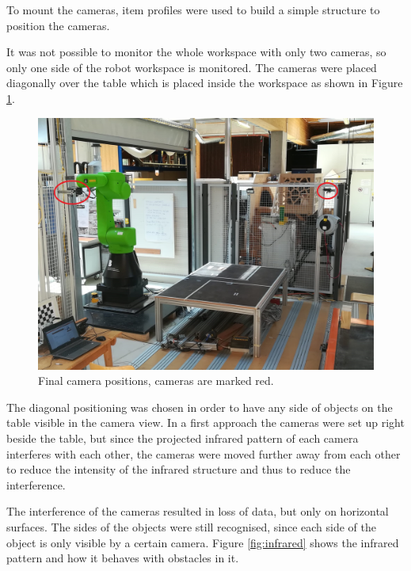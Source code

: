 To mount the cameras, item profiles \cite{Item} were used to build a simple structure to position the cameras.

It was not possible to monitor the whole workspace with only two cameras, so only one side of the robot workspace is monitored. The cameras were placed diagonally over the table which is placed inside the workspace as shown in Figure  \ref{fig:campos}.

\begin{figure}[H]                                      
	\centering\includegraphics[scale=0.2]{images/campos.jpeg}			
	\caption{Final camera positions, cameras are marked red.}
	\label{fig:campos}                      
\end{figure}
 The diagonal positioning was chosen in order to have any side of objects on the table visible in the camera view. In a first approach the cameras were set up right beside the table, but since the projected infrared pattern of each camera interferes with each other, the cameras were moved further away from each other to reduce the intensity\cite{cameraInterference} of the infrared structure and thus to reduce the interference.

The interference of the cameras resulted in loss of data, but only on horizontal surfaces. The sides of the objects were still recognised, since each side of the object is only visible by a certain camera. Figure \ref{fig:infrared} shows the infrared pattern and how it behaves with obstacles in it.



